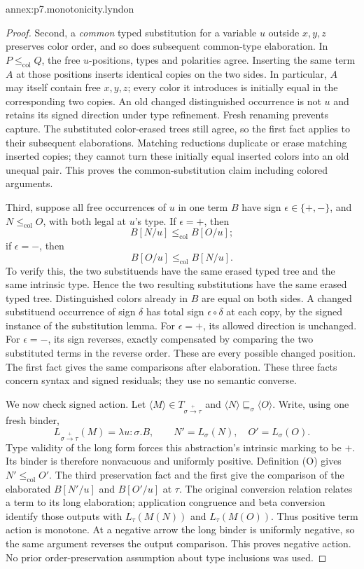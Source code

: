\begin{annexitem}{annex:p7.monotonicity.lyndon}
\begin{proof}
Second, a \emph{common} typed substitution for a variable \(u\) outside
\(x,y,z\) preserves color order, and so does subsequent common-type
elaboration. In \(P\leq_{\mathrm{col}}Q\), the free \(u\)-positions,
types and polarities agree. Inserting the same term \(A\) at those
positions inserts identical copies on the two sides.
In particular, \(A\) may itself contain free \(x,y,z\); every color it
introduces is initially equal in the corresponding two copies.
An old changed distinguished occurrence is not \(u\) and retains its
signed direction under type refinement.
Fresh renaming prevents capture. The substituted color-erased trees
still agree, so the first fact applies to their subsequent elaborations.
Matching reductions duplicate or erase matching inserted copies; they
cannot turn these initially equal inserted colors into an old unequal
pair. This proves the common-substitution claim including colored
arguments.

Third, suppose all free occurrences of \(u\) in one term \(B\) have
sign \(\epsilon\in\{+,-\}\), and \(N\leq_{\mathrm{col}}O\), with both
legal at \(u\)'s type.
If \(\epsilon=+\), then
\[
 B[N/u]\leq_{\mathrm{col}}B[O/u];
\]
if \(\epsilon=-\), then
\[
 B[O/u]\leq_{\mathrm{col}}B[N/u].
\]
To verify this, the two substituends have the same erased typed tree and
the same intrinsic type. Hence the two resulting substitutions have the
same erased typed tree. Distinguished colors already in \(B\) are equal
on both sides. A changed substituend occurrence of sign \(\delta\)
has total sign \(\epsilon\circ\delta\) at each copy, by the signed
instance of the substitution lemma.
For \(\epsilon=+\), its allowed direction is unchanged.
For \(\epsilon=-\), its sign reverses, exactly compensated by comparing
the two substituted terms in the reverse order.
These are every possible changed position. The first fact gives the
same comparisons after elaboration. These three facts concern syntax
and signed residuals; they use no semantic converse.

We now check signed action. Let
\(\langle M\rangle\in T_{\sigma\xrightarrow+\tau}\) and
\(\langle N\rangle\sqsubseteq_\sigma\langle O\rangle\).
Write, using one fresh binder,
\[
 L_{\sigma\xrightarrow+\tau}(M)=\lambda u:\sigma.B,\qquad
 N'=L_\sigma(N),\quad O'=L_\sigma(O).
\]
Type validity of the long form forces this abstraction's intrinsic
marking to be \(+\). Its binder is therefore nonvacuous and uniformly
positive. Definition (O) gives \(N'\leq_{\mathrm{col}}O'\).
The third preservation fact and the first give the comparison of the
elaborated \(B[N'/u]\) and \(B[O'/u]\) at \(\tau\).
The original conversion relation relates a term to its long elaboration;
application congruence and beta conversion identify those outputs with
\(L_\tau(M(N))\) and \(L_\tau(M(O))\).
Thus positive term action is monotone.
At a negative arrow the long binder is uniformly negative, so the same
argument reverses the output comparison. This proves negative action.
No prior order-preservation assumption about type inclusions was used.


\end{proof}
\end{annexitem}
